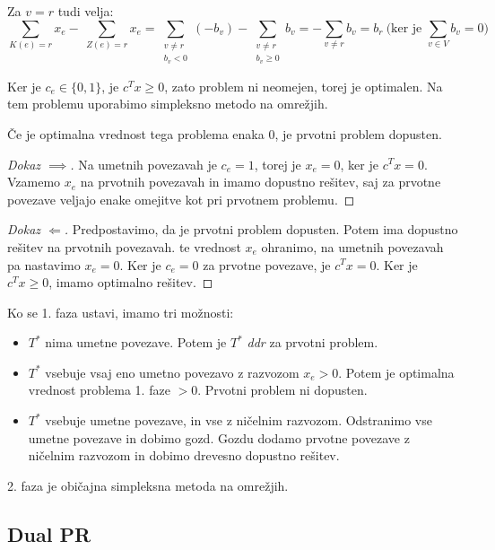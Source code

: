 \documentclass[11pt, a4paper]{article}
\begin{document}
    Za \(v=r\) tudi velja:
    \[
        \sum_{K(e)=r} x_e -\ \sum_{Z(e)=r} x_e = \sum_{\substack{v \neq r \\ b_v < 0}} (-b_v) - \sum_{\substack {v \neq r \\ b_v \ge 0}} b_v = - \sum_{v \neq r} b_v = b_r\ \text{(ker je } \sum_{v \in V} b_v = 0 \text{)}
    \]

    Ker je \(c_e \in \{ 0,1 \}\), je \(c^T x \ge 0\), zato problem ni neomejen, torej je optimalen. Na tem problemu uporabimo simpleksno metodo na omrežjih.

    \begin{proposition}
        Če je optimalna vrednost tega problema enaka 0, je prvotni problem dopusten.
    \end{proposition}

    \begin{proof}[Dokaz \(\implies\)]
        Na umetnih povezavah je \(c_e=1\), torej je \(x_e=0\), ker je \(c^T x = 0\). Vzamemo \(x_e\) na prvotnih povezavah in imamo dopustno rešitev, saj za prvotne povezave veljajo enake omejitve kot pri prvotnem problemu.
    \end{proof}

    \begin{proof}[Dokaz \(\Longleftarrow\)]
        Predpostavimo, da je prvotni problem dopusten. Potem ima dopustno rešitev na prvotnih povezavah. te vrednost \(x_e\) ohranimo, na umetnih povezavah pa nastavimo \(x_e=0\). Ker je \(c_e=0\) za prvotne povezave, je \(c^T x = 0\). Ker je \(c^T x \ge 0\), imamo optimalno rešitev.
    \end{proof}

    Ko se 1. faza ustavi, imamo tri možnosti:
    \begin{itemize}
        \item \(T^\ast\) nima umetne povezave. Potem je \(T^\ast\) \textit{ddr} za prvotni problem.
        \item \(T^\ast\) vsebuje vsaj eno umetno povezavo z razvozom \(x_e > 0\). Potem je optimalna vrednost problema 1. faze \(> 0\). Prvotni problem ni dopusten.
        \item \(T^\ast\) vsebuje umetne povezave, in vse z ničelnim razvozom. Odstranimo vse umetne povezave in dobimo gozd. Gozdu dodamo prvotne povezave z ničelnim razvozom in dobimo drevesno dopustno rešitev.
    \end{itemize}

    2. faza je običajna simpleksna metoda na omrežjih.

    \subsection{Dual PR}
\end{document}
